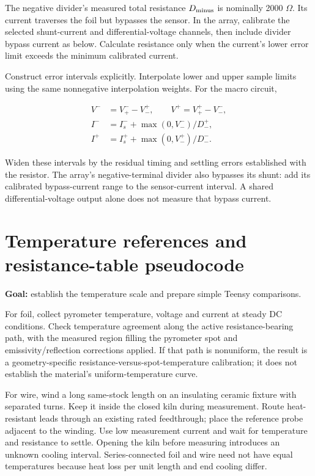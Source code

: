 \documentclass[11pt,letterpaper]{article}
\begin{document}
The negative divider's measured total resistance \(D_{\rm minus}\) is nominally 2000 \ensuremath{\Omega}. Its current traverses the foil but bypasses the sensor. In the array, calibrate the selected shunt-current and differential-voltage channels, then include divider bypass current as below. Calculate resistance only when the current's lower error limit exceeds the minimum calibrated current.

Construct error intervals explicitly. Interpolate lower and upper sample limits using the same nonnegative interpolation weights. For the macro circuit,

\[
\begin{aligned}
V^-&=V_+^- -V_-^+,\qquad V^+=V_+^+-V_-^-,\\
I^-&=I_s^-+\max(0,V_-^-)/D_-^+,\\
I^+&=I_s^++\max(0,V_-^+)/D_-^-.
\end{aligned}
\]

Widen these intervals by the residual timing and settling errors established with the resistor. The array's negative-terminal divider also bypasses its shunt: add its calibrated bypass-current range to the sensor-current interval. A shared differential-voltage output alone does not measure that bypass current.

\section{Temperature references and resistance-table pseudocode}

\textbf{Goal:} establish the temperature scale and prepare simple Teensy comparisons.

For foil, collect pyrometer temperature, voltage and current at steady DC conditions. Check temperature agreement along the active resistance-bearing path, with the measured region filling the pyrometer spot and emissivity/reflection corrections applied. If that path is nonuniform, the result is a geometry-specific resistance-versus-spot-temperature calibration; it does not establish the material's uniform-temperature curve.

For wire, wind a long same-stock length on an insulating ceramic fixture with separated turns. Keep it inside the closed kiln during measurement. Route heat-resistant leads through an existing rated feedthrough; place the reference probe adjacent to the winding. Use low measurement current and wait for temperature and resistance to settle. Opening the kiln before measuring introduces an unknown cooling interval. Series-connected foil and wire need not have equal temperatures because heat loss per unit length and end cooling differ.
\end{document}
